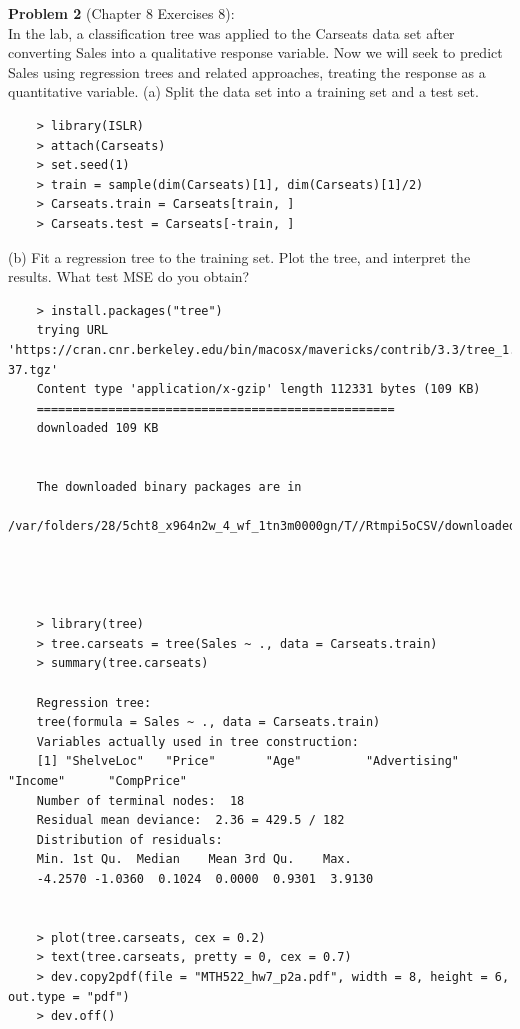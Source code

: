\documentclass{article}
\begin{document}
\newpage
{\bf Problem 2} (Chapter 8 Exercises 8):\\
In the lab, a classification tree was applied to the Carseats data set after converting Sales into a qualitative response variable. Now we will seek to predict Sales using regression trees and related approaches, treating the response as a quantitative variable.
(a) Split the data set into a training set and a test set.\\

\begin{program}
	\begin{verbatim}
	> library(ISLR)
	> attach(Carseats)
	> set.seed(1)
	> train = sample(dim(Carseats)[1], dim(Carseats)[1]/2)
	> Carseats.train = Carseats[train, ]
	> Carseats.test = Carseats[-train, ]
	\end{verbatim}
\end{program}

(b) Fit a regression tree to the training set. Plot the tree, and interpret the results. What test MSE do you obtain?\\

\begin{program}
	\begin{verbatim}
	> install.packages("tree")
	trying URL 'https://cran.cnr.berkeley.edu/bin/macosx/mavericks/contrib/3.3/tree_1.0-37.tgz'
	Content type 'application/x-gzip' length 112331 bytes (109 KB)
	==================================================
	downloaded 109 KB
	
	
	The downloaded binary packages are in
	/var/folders/28/5cht8_x964n2w_4_wf_1tn3m0000gn/T//Rtmpi5oCSV/downloaded_packages
	
	
	
	
	> library(tree)
	> tree.carseats = tree(Sales ~ ., data = Carseats.train)
	> summary(tree.carseats)
	
	Regression tree:
	tree(formula = Sales ~ ., data = Carseats.train)
	Variables actually used in tree construction:
	[1] "ShelveLoc"   "Price"       "Age"         "Advertising" "Income"      "CompPrice"  
	Number of terminal nodes:  18 
	Residual mean deviance:  2.36 = 429.5 / 182 
	Distribution of residuals:
	Min. 1st Qu.  Median    Mean 3rd Qu.    Max. 
	-4.2570 -1.0360  0.1024  0.0000  0.9301  3.9130 
	
	
	> plot(tree.carseats, cex = 0.2)
	> text(tree.carseats, pretty = 0, cex = 0.7)
	> dev.copy2pdf(file = "MTH522_hw7_p2a.pdf", width = 8, height = 6, out.type = "pdf")
	> dev.off()
	\end{verbatim}
\end{program}
\end{document}
